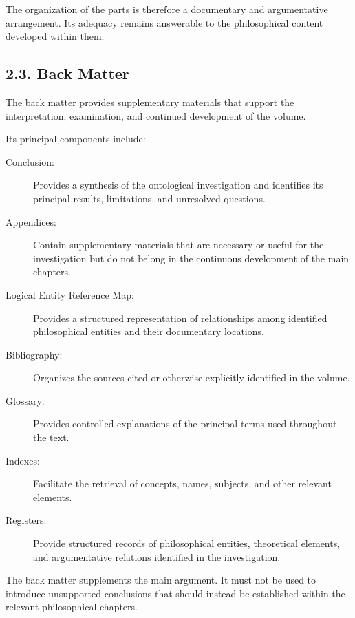The organization of the parts is therefore a
documentary and argumentative arrangement.
Its adequacy remains answerable to the philosophical
content developed within them.

\subsection*{2.3. Back Matter}

The back matter provides supplementary materials
that support the interpretation, examination,
and continued development of the volume.

Its principal components include:

\begin{description}

    \item[Conclusion:]
    Provides a synthesis of the ontological
    investigation and identifies its principal
    results, limitations, and unresolved questions.

    \item[Appendices:]
    Contain supplementary materials that are necessary
    or useful for the investigation but do not belong
    in the continuous development of the main chapters.

    \item[Logical Entity Reference Map:]
    Provides a structured representation of
    relationships among identified philosophical
    entities and their documentary locations.

    \item[Bibliography:]
    Organizes the sources cited or otherwise
    explicitly identified in the volume.

    \item[Glossary:]
    Provides controlled explanations of the principal
    terms used throughout the text.

    \item[Indexes:]
    Facilitate the retrieval of concepts, names,
    subjects, and other relevant elements.

    \item[Registers:]
    Provide structured records of philosophical
    entities, theoretical elements, and argumentative
    relations identified in the investigation.

\end{description}

The back matter supplements the main argument.
It must not be used to introduce unsupported
conclusions that should instead be established
within the relevant philosophical chapters.

